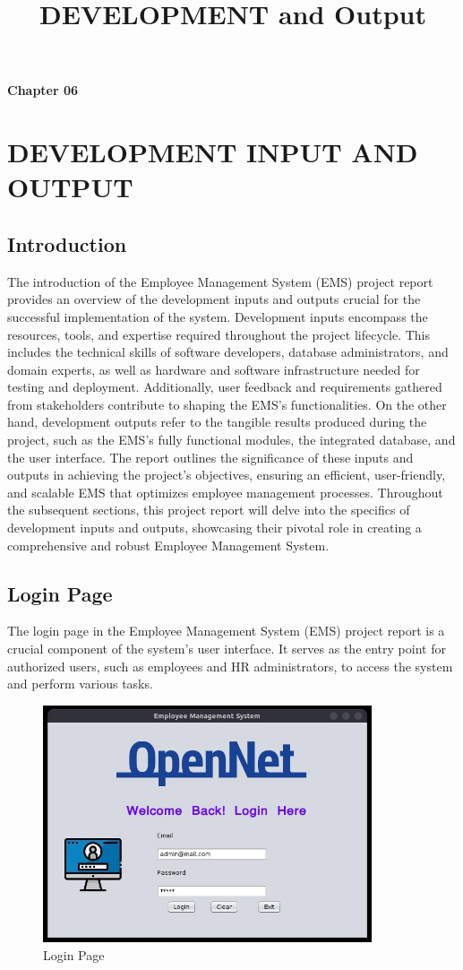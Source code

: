 \title{DEVELOPMENT and Output}
\begin{center}
    \textbf{Chapter 06}\\
    \section{\large \textbf{DEVELOPMENT INPUT AND OUTPUT}}
\end{center}
\vspace{2.5mm}
\subsection{Introduction}
The introduction of the Employee Management System (EMS) project report provides an
overview of the development inputs and outputs crucial for the successful implementation
of the system. Development inputs encompass the resources, tools, and expertise required
throughout the project lifecycle. This includes the technical skills of software developers,
database administrators, and domain experts, as well as hardware and software
infrastructure needed for testing and deployment. Additionally, user feedback and
requirements gathered from stakeholders contribute to shaping the EMS's functionalities.
On the other hand, development outputs refer to the tangible results produced during the
project, such as the EMS's fully functional modules, the integrated database, and the user
interface. The report outlines the significance of these inputs and outputs in achieving the
project's objectives, ensuring an efficient, user-friendly, and scalable EMS that optimizes
employee management processes. Throughout the subsequent sections, this project report
will delve into the specifics of development inputs and outputs, showcasing their pivotal
role in creating a comprehensive and robust Employee Management System.
\newpage
\subsection{Login Page}
The login page in the Employee Management System (EMS) project report is a crucial
component of the system's user interface. It serves as the entry point for authorized users, such
as employees and HR administrators, to access the system and perform various tasks.
\begin{figure}[h]
    \centering
    \includegraphics[height=7cm]{img/appsimg/login.png}
    \caption{Login Page}
    \label{fig:login}
\end{figure}
